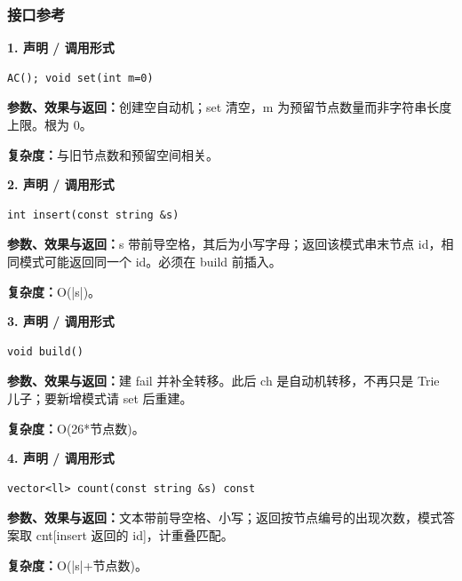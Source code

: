 \documentclass[UTF8,a4paper,10pt]{ctexart}
\begin{document}
\subsubsection*{接口参考}
\noindent\begin{minipage}{\textwidth}
\textbf{1. 声明 / 调用形式}
\begin{lstlisting}
AC(); void set(int m=0)
\end{lstlisting}
\textbf{参数、效果与返回：}创建空自动机；set 清空，m 为预留节点数量而非字符串长度上限。根为 0。

\textbf{复杂度：}与旧节点数和预留空间相关。

\end{minipage}\par\vspace{0.4em}
\noindent\begin{minipage}{\textwidth}
\textbf{2. 声明 / 调用形式}
\begin{lstlisting}
int insert(const string &s)
\end{lstlisting}
\textbf{参数、效果与返回：}s 带前导空格，其后为小写字母；返回该模式串末节点 id，相同模式可能返回同一个 id。必须在 build 前插入。

\textbf{复杂度：}O(|s|)。

\end{minipage}\par\vspace{0.4em}
\noindent\begin{minipage}{\textwidth}
\textbf{3. 声明 / 调用形式}
\begin{lstlisting}
void build()
\end{lstlisting}
\textbf{参数、效果与返回：}建 fail 并补全转移。此后 ch 是自动机转移，不再只是 Trie 儿子；要新增模式请 set 后重建。

\textbf{复杂度：}O(26*节点数)。

\end{minipage}\par\vspace{0.4em}
\noindent\begin{minipage}{\textwidth}
\textbf{4. 声明 / 调用形式}
\begin{lstlisting}
vector<ll> count(const string &s) const
\end{lstlisting}
\textbf{参数、效果与返回：}文本带前导空格、小写；返回按节点编号的出现次数，模式答案取 cnt[insert 返回的 id]，计重叠匹配。

\textbf{复杂度：}O(|s|+节点数)。

\end{minipage}\par\vspace{0.4em}
\end{document}
